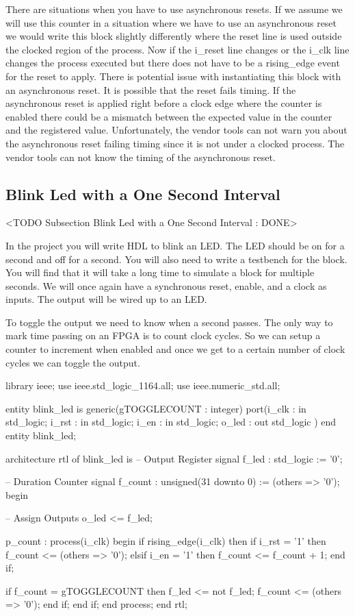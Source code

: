 There are situations when you have to use asynchronous resets. If we assume we will use this counter in a situation where we have to use an asynchronous reset we would write this block slightly differently where the reset line is used outside the clocked region of the process. Now if the i\_reset line changes or the i\_clk line changes the process executed but there does not have to be a rising\_edge event for the reset to apply. There is potential issue with instantiating this block with an asynchronous reset. It is possible that the reset fails timing. If the asynchronous reset is applied right before a clock edge where the counter is enabled there could be a mismatch between the expected value in the counter and the registered value. Unfortunately, the vendor tools can not warn you about the asynchronous reset failing timing since it is not under a clocked process. The vendor tools can not know the timing of the asynchronous reset.	
	
\subsection{Blink Led with a One Second Interval}
	<TODO Subsection Blink Led with a One Second Interval : DONE>

In the project you will write \ac{HDL} to blink an LED. The LED should be on for a second and off for a second. You will also need to write a testbench for the block. You will find that it will take a long time to simulate a block for multiple seconds. We will once again have a synchronous reset, enable, and a clock as inputs. The output will be wired up to an \ac{LED}.

To toggle the output we need to know when a second passes. The only way to mark time passing on an \ac{FPGA} is to count clock cycles. So we can setup a counter to increment when enabled and once we get to a certain number of clock cycles we can toggle the output. 

\begin{VHDLlisting}[tabsize=8]
library ieee;
  use ieee.std_logic_1164.all;
  use ieee.numeric_std.all;
  
entity blink_led is
generic(gTOGGLECOUNT : integer)
port(i_clk   : in    std_logic;
	 i_rst   : in    std_logic;
	 i_en    : in    std_logic;
	 o_led   :   out std_logic	
)
end entity blink_led;

architecture rtl of blink_led is
	-- Output Register
	signal f_led   : std_logic := '0';

	-- Duration Counter
	signal f_count : unsigned(31 downto 0) := (others => '0');
begin

	-- Assign Outputs
	o_led <= f_led;

	p_count : process(i_clk)
	begin
		if rising_edge(i_clk) then
			if i_rst = '1' then
				f_count <= (others => '0');
			elsif i_en = '1' then
				f_count <= f_count + 1;
			end if;	

			if f_count = gTOGGLECOUNT then
				f_led <= not f_led;
				f_count <= (others => '0');
			end if;			
		end if;
	end process;
end rtl;

\end{VHDLlisting}

